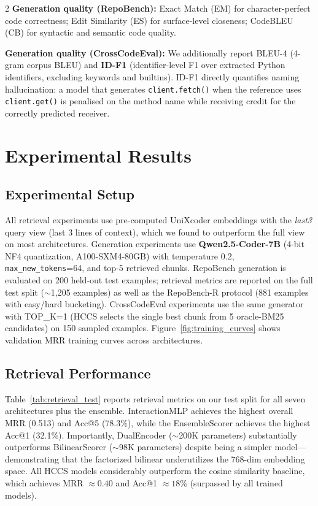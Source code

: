 \documentclass[11pt,a4paper]{article}
\begin{document}
\begin{multicols}{2}
\textbf{Generation quality (RepoBench):} Exact Match (EM) for character-perfect code correctness; Edit Similarity (ES) for surface-level closeness; CodeBLEU (CB) for syntactic and semantic code quality.

\textbf{Generation quality (CrossCodeEval):} We additionally report BLEU-4 (4-gram corpus BLEU) and \textbf{ID-F1} (identifier-level F1 over extracted Python identifiers, excluding keywords and builtins). ID-F1 directly quantifies naming hallucination: a model that generates \texttt{client.fetch()} when the reference uses \texttt{client.get()} is penalised on the method name while receiving credit for the correctly predicted receiver.

\section{Experimental Results}

\subsection{Experimental Setup}

All retrieval experiments use pre-computed UniXcoder embeddings with the \textit{last3} query view (last 3 lines of context), which we found to outperform the full view on most architectures. Generation experiments use \textbf{Qwen2.5-Coder-7B} (4-bit NF4 quantization, A100-SXM4-80GB) with temperature 0.2, \texttt{max\_new\_tokens}=64, and top-5 retrieved chunks. RepoBench generation is evaluated on 200 held-out test examples; retrieval metrics are reported on the full test split ($\sim$1,205 examples) as well as the RepoBench-R protocol (881 examples with easy/hard bucketing). CrossCodeEval experiments use the same generator with TOP\_K=1 (HCCS selects the single best chunk from 5 oracle-BM25 candidates) on 150 sampled examples. Figure~\ref{fig:training_curves} shows validation MRR training curves across architectures.

\subsection{Retrieval Performance}

Table~\ref{tab:retrieval_test} reports retrieval metrics on our test split for all seven architectures plus the ensemble. InteractionMLP achieves the highest overall MRR (0.513) and Acc@5 (78.3\%), while the EnsembleScorer achieves the highest Acc@1 (32.1\%). Importantly, DualEncoder ($\sim$200K parameters) substantially outperforms BilinearScorer ($\sim$98K parameters) despite being a simpler model---demonstrating that the factorized bilinear underutilizes the 768-dim embedding space. All HCCS models considerably outperform the cosine similarity baseline, which achieves MRR $\approx 0.40$ and Acc@1 $\approx 18$\% (surpassed by all trained models).


\end{multicols}
\end{document}
